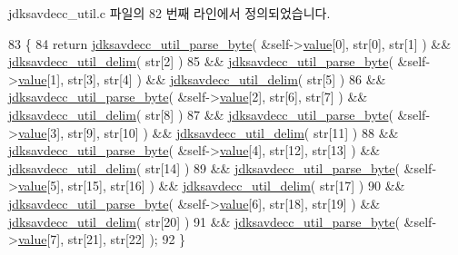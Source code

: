 jdksavdecc\+\_\+util.\+c 파일의 82 번째 라인에서 정의되었습니다.


\begin{DoxyCode}
83 \{
84     \textcolor{keywordflow}{return} \hyperlink{group__util_ga82a47aacd3de4b522a4ac6a52d72e17e}{jdksavdecc\_util\_parse\_byte}( &self->\hyperlink{structjdksavdecc__eui64_ac7a8beb4da4fc8eb8acfec13711a134f}{value}[0], str[0], str[1] ) && 
      \hyperlink{jdksavdecc__util_8c_a9b2d5ec940714d3c9cec91adafc62e6b}{jdksavdecc\_util\_delim}( str[2] )
85            && \hyperlink{group__util_ga82a47aacd3de4b522a4ac6a52d72e17e}{jdksavdecc\_util\_parse\_byte}( &self->\hyperlink{structjdksavdecc__eui64_ac7a8beb4da4fc8eb8acfec13711a134f}{value}[1], str[3], str[4] ) 
      && \hyperlink{jdksavdecc__util_8c_a9b2d5ec940714d3c9cec91adafc62e6b}{jdksavdecc\_util\_delim}( str[5] )
86            && \hyperlink{group__util_ga82a47aacd3de4b522a4ac6a52d72e17e}{jdksavdecc\_util\_parse\_byte}( &self->\hyperlink{structjdksavdecc__eui64_ac7a8beb4da4fc8eb8acfec13711a134f}{value}[2], str[6], str[7] ) 
      && \hyperlink{jdksavdecc__util_8c_a9b2d5ec940714d3c9cec91adafc62e6b}{jdksavdecc\_util\_delim}( str[8] )
87            && \hyperlink{group__util_ga82a47aacd3de4b522a4ac6a52d72e17e}{jdksavdecc\_util\_parse\_byte}( &self->\hyperlink{structjdksavdecc__eui64_ac7a8beb4da4fc8eb8acfec13711a134f}{value}[3], str[9], str[10] )
       && \hyperlink{jdksavdecc__util_8c_a9b2d5ec940714d3c9cec91adafc62e6b}{jdksavdecc\_util\_delim}( str[11] )
88            && \hyperlink{group__util_ga82a47aacd3de4b522a4ac6a52d72e17e}{jdksavdecc\_util\_parse\_byte}( &self->\hyperlink{structjdksavdecc__eui64_ac7a8beb4da4fc8eb8acfec13711a134f}{value}[4], str[12], str[13] 
      ) && \hyperlink{jdksavdecc__util_8c_a9b2d5ec940714d3c9cec91adafc62e6b}{jdksavdecc\_util\_delim}( str[14] )
89            && \hyperlink{group__util_ga82a47aacd3de4b522a4ac6a52d72e17e}{jdksavdecc\_util\_parse\_byte}( &self->\hyperlink{structjdksavdecc__eui64_ac7a8beb4da4fc8eb8acfec13711a134f}{value}[5], str[15], str[16] 
      ) && \hyperlink{jdksavdecc__util_8c_a9b2d5ec940714d3c9cec91adafc62e6b}{jdksavdecc\_util\_delim}( str[17] )
90            && \hyperlink{group__util_ga82a47aacd3de4b522a4ac6a52d72e17e}{jdksavdecc\_util\_parse\_byte}( &self->\hyperlink{structjdksavdecc__eui64_ac7a8beb4da4fc8eb8acfec13711a134f}{value}[6], str[18], str[19] 
      ) && \hyperlink{jdksavdecc__util_8c_a9b2d5ec940714d3c9cec91adafc62e6b}{jdksavdecc\_util\_delim}( str[20] )
91            && \hyperlink{group__util_ga82a47aacd3de4b522a4ac6a52d72e17e}{jdksavdecc\_util\_parse\_byte}( &self->\hyperlink{structjdksavdecc__eui64_ac7a8beb4da4fc8eb8acfec13711a134f}{value}[7], str[21], str[22] 
      );
92 \}
\end{DoxyCode}


